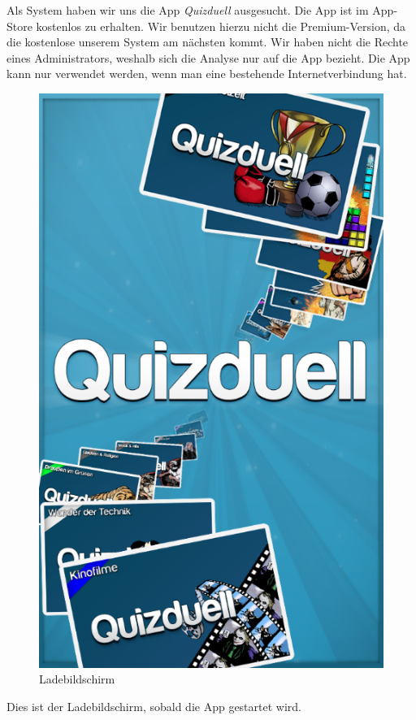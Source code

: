 \documentclass[fontsize=12pt,paper=a4,twoside]{scrartcl}
\begin{document}
Als System haben wir uns die App \textit{Quizduell} ausgesucht. Die App ist im App-Store kostenlos zu erhalten. Wir benutzen hierzu nicht die Premium-Version, da die kostenlose unserem System am nächsten kommt. Wir haben nicht die Rechte eines Administrators, weshalb sich die Analyse nur auf die App bezieht. Die App kann nur verwendet werden, wenn man eine bestehende Internetverbindung hat.\\

\begin{figure}[H]
\centering
\includegraphics[scale=0.5]{Bilder/lade.png}
\caption{Ladebildschirm}
\end{figure}

Dies ist der Ladebildschirm, sobald die App gestartet wird.
\end{document}
